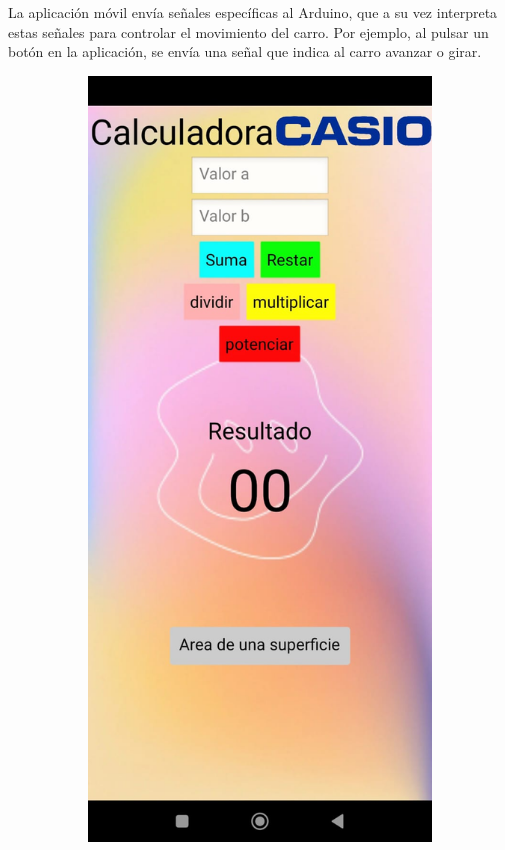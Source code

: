 La aplicación móvil envía señales específicas al Arduino, que a su vez interpreta estas señales para controlar el movimiento del carro. Por ejemplo, al pulsar un botón en la aplicación, se envía una señal que indica al carro avanzar o girar.

\begin{figure}[H]
    \centering
    \begin{subfigure}[b]{0.4\textwidth}
        \centering
        \includegraphics[width=\textwidth]{Figures/0. General/app_screenshot_1.png}

\end{subfigure}
\end{figure}
